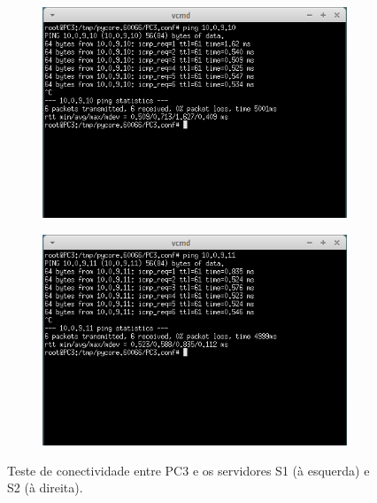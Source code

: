 \documentclass{llncs}
\begin{document}
\begin{figure}[h]
	\centering
	\begin{subfigure}{.5\textwidth}
		\centering
		\includegraphics[width=0.75\linewidth]{./imagens/PC3_S1.png}
	\end{subfigure}%
	\begin{subfigure}{.5\textwidth}
		\centering
		\includegraphics[width=0.75\linewidth]{./imagens/PC3_S2.png}
	\end{subfigure}
	\caption{Teste de conectividade entre PC3 e os servidores S1 (à esquerda) e S2 (à direita).}
	\label{fig:pc3_s}
\end{figure}
\end{document}
